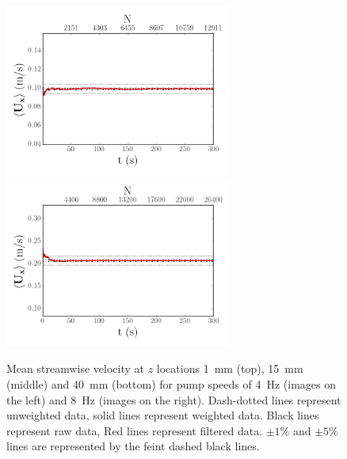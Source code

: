 \documentclass[12pt,oneside,a4paper]{article}
\begin{document}
\begin{figure}
\includegraphics[width=7.5cm]{images/LDA_timeDependenceImages/4hz_x_400_z_40_MeanUx.png}\hfill
\includegraphics[width=7.5cm]{images/LDA_timeDependenceImages/8hz_x_400_z_40_MeanUx.png}\\
\caption{Mean streamwise velocity at $z$ locations \SI{1}{mm} (top), \SI{15}{mm} (middle) and \SI{40}{mm} (bottom) for pump speeds of \SI{4}{Hz} (images on the left) and \SI{8}{Hz} (images on the right). Dash-dotted lines represent unweighted data, solid lines represent weighted data. Black lines represent raw data, Red lines represent filtered data. $\pm 1\%$ and $\pm 5\%$ lines are represented by the feint dashed black lines.}
\label{figure:experiments:timeDependence:meanUx}
\end{figure}
\end{document}
